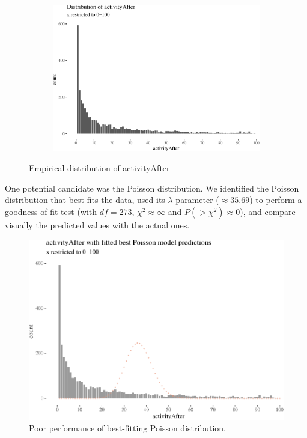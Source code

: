 \documentclass[10pt,]{scrartcl}
\begin{document}
\begin{figure}
\begin{subfigure}[b]{0.45\textwidth}
\begin{center}\includegraphics[width=1\linewidth]{redditAnalysisWalkthrough_files/figure-latex/unnamed-chunk-65-1} \end{center}
\end{subfigure}
\caption{Empirical distribution of activityAfter}
\label{fig:activityDistro}
\end{figure}

\footnotesize

\normalsize 

One potential candidate was the Poisson distribution. We identified the
Poisson distribution that best fits the data, used its \(\lambda\)
parameter (\(\approx 35.69\)) to perform a goodness-of-fit test (with
\(df=273\), \(\chi^2 \approx \infty\) and \(P(>\chi^2)\approx 0\)), and
compare visually the predicted values with the actual ones.

\begin{figure}

\begin{center}\includegraphics[width=1\linewidth]{redditAnalysisWalkthrough_files/figure-latex/unnamed-chunk-68-1} \end{center}
\caption{Poor performance of best-fitting Poisson distribution.}
\end{figure}
\end{document}

